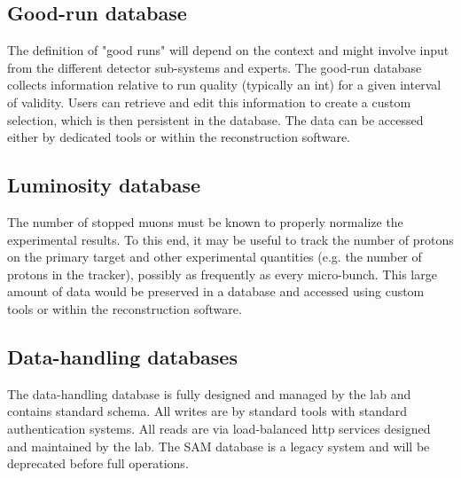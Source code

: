 \subsection{Good-run database} 
The definition of "good runs" will depend on the context and might involve input from the different detector sub-systems and experts. The good-run database collects information relative to run quality (typically an int) for a given interval of validity. Users can retrieve and edit this information to create a custom selection, which is then persistent in the database. The data can be accessed either by dedicated tools or within the reconstruction software. 


\subsection{Luminosity database}
The number of stopped muons must be known to properly normalize the experimental results. To this end, it may be useful to track the number of protons on the primary target and other experimental quantities (e.g. the number of protons in the tracker), possibly as frequently as every micro-bunch. This large amount of data would be preserved in a database and accessed using custom tools or within the reconstruction software.

\subsection{Data-handling databases}
The data-handling database is fully designed and managed by the lab and contains standard schema. All writes are by standard tools with standard authentication systems. All reads are via load-balanced http services designed and maintained by the lab. The SAM database is a legacy system and will be deprecated before full operations.

